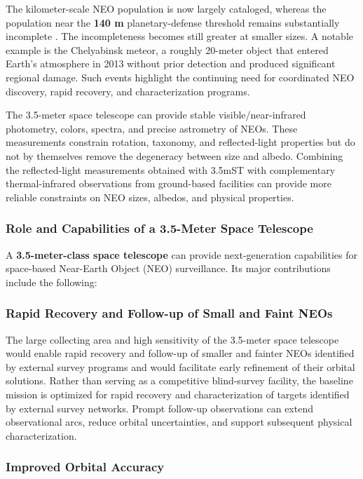 The kilometer-scale NEO population is now largely cataloged, whereas the population near the \textbf{140 m} planetary-defense threshold remains substantially incomplete \cite{nasa2023}. The incompleteness becomes still greater at smaller sizes. A notable example is the Chelyabinsk meteor, a roughly 20-meter object that entered Earth's atmosphere in 2013 without prior detection and produced significant regional damage. Such events highlight the continuing need for coordinated NEO discovery, rapid recovery, and characterization programs.

The 3.5-meter space telescope can provide stable visible/near-infrared
photometry, colors, spectra, and precise astrometry of NEOs. These
measurements constrain rotation, taxonomy, and reflected-light properties
but do not by themselves remove the degeneracy between size and albedo.
Combining the reflected-light measurements obtained with 3.5mST with
complementary thermal-infrared observations from ground-based facilities
can provide more reliable constraints on NEO sizes, albedos, and physical
properties.


\subsubsection{Role and Capabilities of a 3.5-Meter Space Telescope}

A \textbf{3.5-meter-class space telescope} can provide next-generation capabilities for space-based Near-Earth Object (NEO) surveillance. Its major contributions include the following:

\subsubsection{Rapid Recovery and Follow-up of Small and Faint NEOs}\label{rapid-recovery-and-follow-up-of-small-neos}

The large collecting area and high sensitivity of the 3.5-meter space
telescope would enable rapid recovery and follow-up of smaller and fainter
NEOs identified by external survey programs and would facilitate early
refinement of their orbital solutions.
Rather than serving as a competitive blind-survey facility, the baseline mission is optimized for rapid recovery and characterization of targets identified by external survey networks. Prompt follow-up observations can extend observational arcs, reduce orbital uncertainties, and support subsequent physical characterization.

\subsubsection{Improved Orbital Accuracy}\label{improved-orbital-accuracy}

